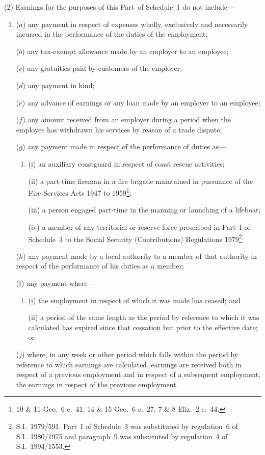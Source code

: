 \documentclass[12pt,a4paper]{article}
\begin{document}
(2) Earnings for the purposes of this Part~of Schedule~1 do not include—
\begin{enumerate}\item[]
($a$) any payment in respect of expenses wholly, exclusively and necessarily incurred in the performance of the duties of the employment;

($b$) any tax-exempt allowance made by an employer to an employee;

($c$) any gratuities paid by customers of the employer;

($d$) any payment in kind;

($e$) any advance of earnings or any loan made by an employer to an employee;

($f$) any amount received from an employer during a period when the employee has withdrawn his services by reason of a trade dispute;

($g$) any payment made in respect of the performance of duties as—
\begin{enumerate}\item[]
(i) an auxiliary coastguard in respect of coast rescue activities;

(ii) a part-time fireman in a fire brigade maintained in pursuance of the Fire Services Acts 1947 to 1959\footnote{10 \& 11 Geo.\ 6 c.\ 41, 14 \& 15 Geo.\ 6 c.\ 27, 7 \& 8 Eliz.~2 c.\ 44.};

(iii) a person engaged part-time in the manning or launching of a lifeboat;

(iv) a member of any territorial or reserve force prescribed in Part~I of Schedule~3 to the Social Security (Contributions) Regulations 1979\footnote{S.I.~1979/591. Part~I of Schedule~3 was substituted by regulation~6 of S.I.~1980/1975 and paragraph~9 was substituted by regulation~4 of S.I.~1994/1553.};
\end{enumerate}

($h$) any payment made by a local authority to a member of that authority in respect of the performance of his duties as a member;

($i$) any payment where—
\begin{enumerate}\item[]
(i) the employment in respect of which it was made has ceased; and

(ii) a period of the same length as the period by reference to which it was calculated has expired since that cessation but prior to the effective date; or
\end{enumerate}

($j$) where, in any week or other period which falls within the period by reference to which earnings are calculated, earnings are received both in respect of a previous employment and in respect of a subsequent employment, the earnings in respect of the previous employment.
\end{enumerate}
\end{document}
